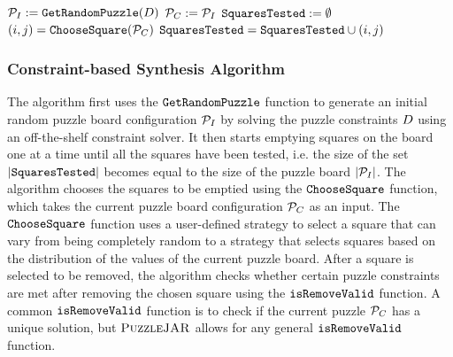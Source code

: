 \begin{algorithm}[!htpb]
\caption{$\puzzlegen$($\puzzledecl$, $\puzzlecomplexity$, $\puzzletransformset$)}
\begin{algorithmic}[1]
\STATE $\mathcal{P}_I := \texttt{GetRandomPuzzle}(D)$
\STATE $\mathcal{P}_C := \mathcal{P}_I$
\STATE $\texttt{SquaresTested} := \emptyset$
\STATE{$\complexitydict := \{\}$}
\WHILE{$|\squarestested| \neq |\randomPuzzle|$}
\STATE $(i,j) = \texttt{ChooseSquare}(\mathcal{P}_C)$
\STATE $\texttt{SquaresTested} = \texttt{SquaresTested} \cup (i,j)$
\STATE {\[ \currentpuzzle'(k,l) = \left\{ 
  \begin{array}{l l}
    \currentpuzzle(k,l) & \quad \mbox{if $(k,l) \neq (i,j)$}\\
    \phi & \quad \mbox{if $(k,l) = (i,j)$}
  \end{array} \right.\]
}
\STATE{$\allpuzzles := \emptyset$}
\FOR{$\puzzletransform \in \puzzletransformset$}
\ENDFOR
\FOR{$\puzzleboard \in \allpuzzles$}
\STATE{$\complexitydict[h] := \complexitydict[h] \cup \puzzleboard$}
\ENDFOR
{}
\ENDIF
\ENDWHILE
\RETURN{$\complexitydict$}
\end{algorithmic}
\end{algorithm}

\subsubsection{Constraint-based Synthesis Algorithm}

The algorithm first uses the $\texttt{GetRandomPuzzle}$ function to generate an initial
random puzzle board configuration $\mathcal{P}_I$ by solving the
puzzle constraints $\puzzledecl$ using an off-the-shelf constraint
solver. It then starts emptying squares on the board one at a time
until all the squares have been tested, i.e. the size of the set
$|\texttt{SquaresTested}|$ becomes equal to the size of the puzzle board
$|\mathcal{P}_I|$. The algorithm chooses the squares to be emptied
using the $\texttt{ChooseSquare}$ function, which takes the current puzzle
board configuration $\mathcal{P}_C$ as an input. The $\texttt{ChooseSquare}$
function uses a user-defined strategy to select a square that can vary
from being completely random to a strategy that selects squares based
on the distribution of the values of the current puzzle board. After a
square is selected to be removed, the algorithm checks whether certain
puzzle constraints are met after removing the chosen square using the
$\texttt{isRemoveValid}$ function. A common $\texttt{isRemoveValid}$ function is to
check if the current puzzle $\mathcal{P}_C$ has a unique solution,
but $\textsc{PuzzleJAR}$ allows for any general $\texttt{isRemoveValid}$ function.

